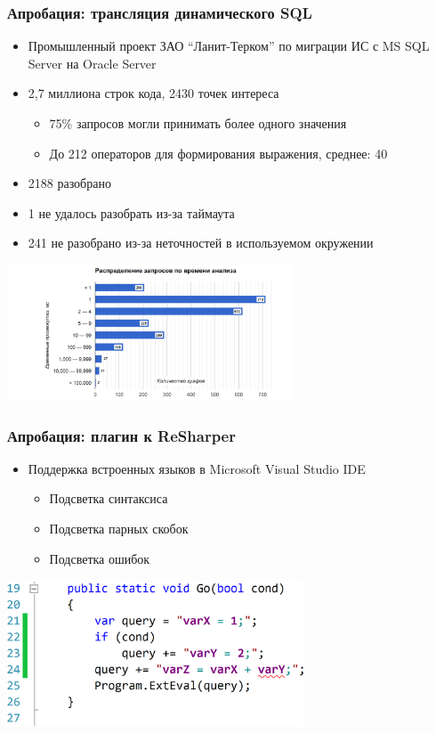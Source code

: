 \documentclass{beamer}
\begin{document}
\begin{frame}[t]
    \transwipe[direction=90]
    \frametitle{Апробация: трансляция динамического SQL}
    \begin{itemize}
    \item Промышленный проект ЗАО ``Ланит-Терком'' по миграции ИС с MS SQL Server на Oracle Server
    \item 2,7 миллиона строк кода, 2430 точек интереса
        \begin{itemize}
            \item 75\% запросов могли принимать более одного значения
            \item До 212 операторов для формирования выражения, среднее: 40  
        \end{itemize}
    \item 2188 разобрано
    \item 1 не удалось разобрать из-за таймаута
    \item 241 не разобрано из-за неточностей в используемом окружении
  \end{itemize}
  \includegraphics[width=8.5cm]{pictures/dist.png}
\end{frame}

\begin{frame}[t]
    \transwipe[direction=90]
    \frametitle{Апробация: плагин к ReSharper}
        \begin{itemize}
            \item Поддержка встроенных языков в Microsoft Visual Studio IDE
            \begin{itemize}
                \item Подсветка синтаксиса
                \item Подсветка парных скобок
                \item Подсветка ошибок
            \end{itemize}
        \end{itemize}
    \begin{center}
      \includegraphics[width=250pt]{pictures/RShExampe.png}
    \end{center}
\end{frame}
\end{document}
